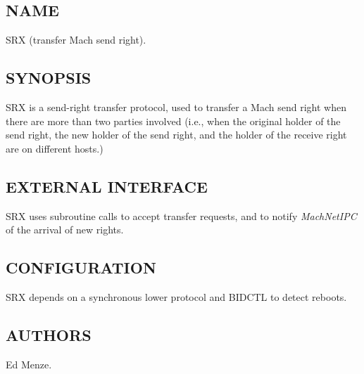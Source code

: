 %
%
%

\subsection*{NAME}

\noindent SRX (transfer Mach send right).


\subsection*{SYNOPSIS}

SRX is a send-right transfer protocol, used to transfer a Mach send
right when there are more than two parties involved (i.e., when the
original holder of the send right, the new holder of the send right,
and the holder of the receive right are on different hosts.)


\noindent
\subsection*{EXTERNAL INTERFACE}

SRX uses subroutine calls to accept transfer requests, and to notify 
{\em MachNetIPC} of the arrival of new rights.

\subsection*{CONFIGURATION}

SRX depends on a synchronous lower protocol and BIDCTL to detect
reboots.


\subsection*{AUTHORS}

\noindent Ed Menze.
